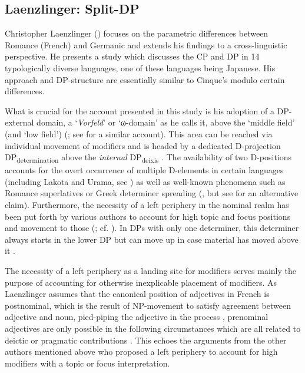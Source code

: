 \subsection{Laenzlinger: Split-DP} \label{laenzdp}

Christopher Laenzlinger (\citeyear{laenzlinger:1998:comparative, laenzlinger:2005:french, laenzlinger:2010:cp, laenzlinger:2011:elements, laenzlinger:2015:the}) focuses on the parametric differences between Romance (French) and Germanic and extends his findings to a cross-linguistic perspective. He presents a study which discusses the CP and DP in 14 typologically diverse languages, one of these languages being Japanese. His approach and DP-structure are essentially similar to Cinque’s modulo certain differences.

What is crucial for the account presented in this study is his adoption of a DP-external domain, a `\textit{Vorfeld}’ or `ω-domain’ as he calls it, above the `middle field’ (and `low field’) (\citealt[7]{laenzlinger:2011:elements}; see \citealt{grohmann:2003:prolific} for a similar account). This area can be reached via individual movement of modifiers and is headed by a dedicated D-projection DP\textsubscript{determination} above the \textit{internal} DP\textsubscript{deixis} \citep[668–669]{laenzlinger:2005:french}. The availability of two D-positions accounts for the overt occurrence of multiple D-elements in certain languages (including  Lakota and  Urama, see \citealt[187–193]{becker:2018:articles}) as well as well-known phenomena such as  Romance superlatives \citep{bruge:2002:positions, bernstein:2001:focusing} or  Greek determiner spreading (\citealt{androutsopoulou:1995:ds}, but see \citealt{lekakou:2012:poly} for an alternative claim). Furthermore, the necessity of a left periphery in the nominal realm has been put forth by various authors to account for high topic and focus positions and movement to those (\citealt{giusti:1996:is, dimitrova:1998:fragments, ihsane:2001:specific, aboh:2004:topic, aboh:2006:when, grohmann:2003:prolific, grohmann:2015:demonstrative}; cf. \citealt[173–178]{laenzlinger:2011:elements}). In DPs with only one determiner, this determiner always starts in the lower DP but can move up in case material has moved above it \citep[667]{laenzlinger:2005:french}.

The necessity of a left periphery as a landing site for modifiers serves mainly the purpose of accounting for otherwise inexplicable placement of modifiers. As Laenzlinger assumes that the canonical position of adjectives in French is postnominal, which is the result of NP-movement to satisfy agreement between adjective and noun, pied-piping the adjective in the process \citep[657–662]{laenzlinger:2005:french}, prenominal adjectives are only possible in the following circumstances which are all related to deictic or pragmatic contributions \citep[666]{laenzlinger:2005:french}. This echoes the arguments from the other authors mentioned above who proposed a left periphery to account for high modifiers with a topic or focus interpretation. 

